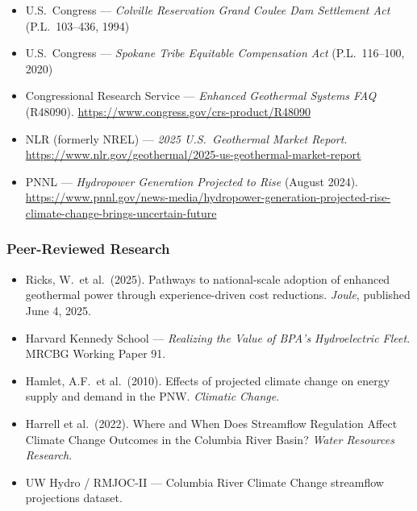 \documentclass[11pt,letterpaper]{article}
\begin{document}
\begin{itemize}[leftmargin=2em]
\item U.S.\ Congress --- \textit{Colville Reservation Grand Coulee Dam Settlement Act} (P.L.\ 103--436, 1994)
\item U.S.\ Congress --- \textit{Spokane Tribe Equitable Compensation Act} (P.L.\ 116--100, 2020)
\item Congressional Research Service --- \textit{Enhanced Geothermal Systems FAQ} (R48090). \url{https://www.congress.gov/crs-product/R48090}
\item NLR (formerly NREL) --- \textit{2025 U.S.\ Geothermal Market Report}. \url{https://www.nlr.gov/geothermal/2025-us-geothermal-market-report}
\item PNNL --- \textit{Hydropower Generation Projected to Rise} (August 2024). \url{https://www.pnnl.gov/news-media/hydropower-generation-projected-rise-climate-change-brings-uncertain-future}
\end{itemize}

\subsubsection{Peer-Reviewed Research}
\begin{itemize}[leftmargin=2em]
\item Ricks, W.\ et al.\ (2025). Pathways to national-scale adoption of enhanced geothermal power through experience-driven cost reductions. \textit{Joule}, published June 4, 2025.
\item Harvard Kennedy School --- \textit{Realizing the Value of BPA's Hydroelectric Fleet}. MRCBG Working Paper 91.
\item Hamlet, A.F.\ et al.\ (2010). Effects of projected climate change on energy supply and demand in the PNW. \textit{Climatic Change}.
\item Harrell et al.\ (2022). Where and When Does Streamflow Regulation Affect Climate Change Outcomes in the Columbia River Basin? \textit{Water Resources Research}.
\item UW Hydro / RMJOC-II --- Columbia River Climate Change streamflow projections dataset.
\end{itemize}
\end{document}

